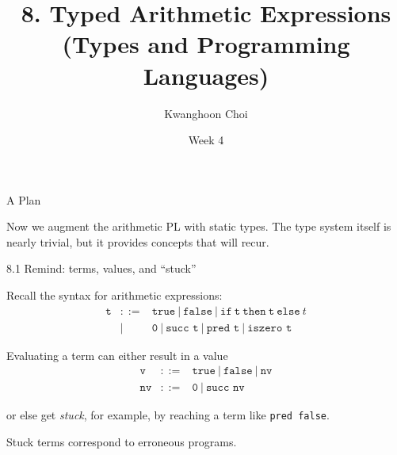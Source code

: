 \documentclass[table]{beamer}
\title[Types and Programming Languages]{8. Typed Arithmetic Expressions \\
(Types and Programming Languages)}
\author[K. Choi]{Kwanghoon Choi}
\institute[Chonnam National University]{
Software Languages and Systems Laboratory \\
	Chonnam National University}
\date{Week 4}
\begin{document}
\begin{frame}
	\titlepage
	
\end{frame}


\begin{frame}[t]{A Plan} \vspace{10pt}

Now we augment the arithmetic PL with static types. The type system itself is nearly trivial, but it provides concepts that will recur.

\end{frame}

\begin{frame}[t]{8.1 Remind: terms, values, and ``stuck''} \vspace{10pt}

Recall the syntax for arithmetic expressions:
\begin{eqnarray*}
\texttt{t} & ::= & \texttt{true} \ | \ 
 \texttt{false} \ | \ 
 \texttt{if} \ \texttt{t} \ \texttt{then} \ \texttt{t} \ \texttt{else} \ t \\
 & | & \texttt{0} \ | \ 
 \texttt{succ t} \ | \ 
 \texttt{pred t} \ | \ 
 \texttt{iszero t} 
\end{eqnarray*}

Evaluating a term can either result in a value 
\begin{eqnarray*}
\texttt{v} & ::= & \texttt{true} \ | \  \texttt{false} \ | \  \texttt{nv} \\
\texttt{nv} & ::= & \texttt{0} \ | \ \texttt{succ nv}
\end{eqnarray*}

or else get {\it stuck}, for example, by reaching a term like \texttt{pred false}.

\vspace{10pt}

Stuck terms correspond to erroneous programs.

\end{frame}
\end{document}
